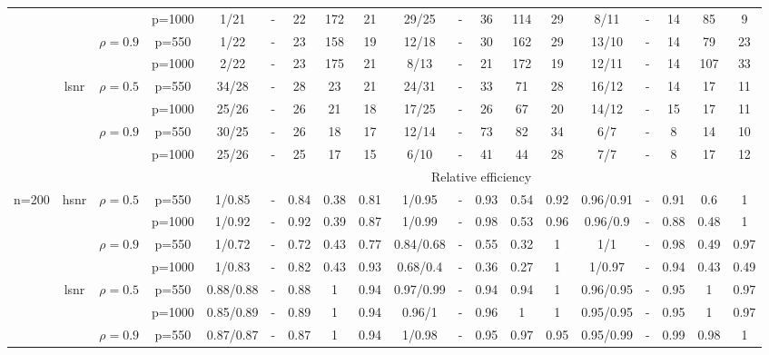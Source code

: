 \begin{table}[ht]
{\begin{tabular}{|c|c|c|c|ccccc|ccccc|ccccc|}
   &  &  & p=1000 & 1/21 & - & 22 & 172 & 21 & 29/25 & - & 36 & 114 & 29 & 8/11 & - & 14 & 85 & 9 \\ 
   &  & \multirow{2}[1]{*}{$\rho=0.9$} & p=550 & 1/22 & - & 23 & 158 & 19 & 12/18 & - & 30 & 162 & 29 & 13/10 & - & 14 & 79 & 23 \\ 
   &  &  & p=1000 & 2/22 & - & 23 & 175 & 21 & 8/13 & - & 21 & 172 & 19 & 12/11 & - & 14 & 107 & 33 \\ 
  \cmidrule{2-19} & \multirow{4}[2]{*}{lsnr} & \multirow{2}[1]{*}{$\rho=0.5$} & p=550 & 34/28 & - & 28 & 23 & 21 & 24/31 & - & 33 & 71 & 28 & 16/12 & - & 14 & 17 & 11 \\ 
   &  &  & p=1000 & 25/26 & - & 26 & 21 & 18 & 17/25 & - & 26 & 67 & 20 & 14/12 & - & 15 & 17 & 11 \\ 
   &  & \multirow{2}[1]{*}{$\rho=0.9$} & p=550 & 30/25 & - & 26 & 18 & 17 & 12/14 & - & 73 & 82 & 34 & 6/7 & - & 8 & 14 & 10 \\ 
   &  &  & p=1000 & 25/26 & - & 25 & 17 & 15 & 6/10 & - & 41 & 44 & 28 & 7/7 & - & 8 & 17 & 12 \\ 
   \midrule 
 \multicolumn{1}{|c}{} & \multicolumn{1}{c}{} & \multicolumn{1}{c}{} &       & \multicolumn{15}{c|}{Relative efficiency} \\
 \midrule 
\multirow{8}[4]{*}{n=200} & \multirow{4}[2]{*}{hsnr} & \multirow{2}[1]{*}{$\rho=0.5$} & p=550 & 1/0.85 & - & 0.84 & 0.38 & 0.81 & 1/0.95 & - & 0.93 & 0.54 & 0.92 & 0.96/0.91 & - & 0.91 & 0.6 & 1 \\ 
   &  &  & p=1000 & 1/0.92 & - & 0.92 & 0.39 & 0.87 & 1/0.99 & - & 0.98 & 0.53 & 0.96 & 0.96/0.9 & - & 0.88 & 0.48 & 1 \\ 
   &  & \multirow{2}[1]{*}{$\rho=0.9$} & p=550 & 1/0.72 & - & 0.72 & 0.43 & 0.77 & 0.84/0.68 & - & 0.55 & 0.32 & 1 & 1/1 & - & 0.98 & 0.49 & 0.97 \\ 
   &  &  & p=1000 & 1/0.83 & - & 0.82 & 0.43 & 0.93 & 0.68/0.4 & - & 0.36 & 0.27 & 1 & 1/0.97 & - & 0.94 & 0.43 & 0.49 \\ 
  \cmidrule{2-19} & \multirow{4}[2]{*}{lsnr} & \multirow{2}[1]{*}{$\rho=0.5$} & p=550 & 0.88/0.88 & - & 0.88 & 1 & 0.94 & 0.97/0.99 & - & 0.94 & 0.94 & 1 & 0.96/0.95 & - & 0.95 & 1 & 0.97 \\ 
   &  &  & p=1000 & 0.85/0.89 & - & 0.89 & 1 & 0.94 & 0.96/1 & - & 0.96 & 1 & 1 & 0.95/0.95 & - & 0.95 & 1 & 0.97 \\ 
   &  & \multirow{2}[1]{*}{$\rho=0.9$} & p=550 & 0.87/0.87 & - & 0.87 & 1 & 0.94 & 1/0.98 & - & 0.95 & 0.97 & 0.95 & 0.95/0.99 & - & 0.99 & 0.98 & 1 \\ 

\end{tabular}}
\end{table}
